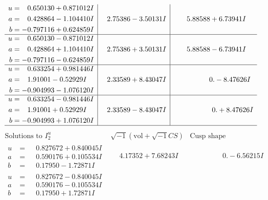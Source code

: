 \documentclass[1p]{elsarticle_modified}
\theoremstyle{definition}
\newcommand{\I}{\sqrt{-1}}
\begin{document}
$$\begin{array}{c|c|c}
\begin{aligned}
u &= \phantom{-}0.650130 + 0.871012 I \\
a &= \phantom{-}0.428864 - 1.104410 I \\
b &= -0.797116 + 0.624859 I\end{aligned}
 & \phantom{-}2.75386 - 3.50131 I & \phantom{-}5.88588 + 6.73941 I \\ \hline\begin{aligned}
u &= \phantom{-}0.650130 - 0.871012 I \\
a &= \phantom{-}0.428864 + 1.104410 I \\
b &= -0.797116 - 0.624859 I\end{aligned}
 & \phantom{-}2.75386 + 3.50131 I & \phantom{-}5.88588 - 6.73941 I \\ \hline\begin{aligned}
u &= \phantom{-}0.633254 + 0.981446 I \\
a &= \phantom{-}1.91001 - 0.52929 I \\
b &= -0.904993 - 1.076120 I\end{aligned}
 & \phantom{-}2.33589 + 8.43047 I & \phantom{-0.000000 } 0. - 8.47626 I \\ \hline\begin{aligned}
u &= \phantom{-}0.633254 - 0.981446 I \\
a &= \phantom{-}1.91001 + 0.52929 I \\
b &= -0.904993 + 1.076120 I\end{aligned}
 & \phantom{-}2.33589 - 8.43047 I & \phantom{-0.000000 -}0. + 8.47626 I\\
 \hline 
 \end{array}$$\newpage$$\begin{array}{c|c|c}  
\text{Solutions to }I^u_{2}& \I (\text{vol} + \sqrt{-1}CS) & \text{Cusp shape}\\
 \hline 
\begin{aligned}
u &= \phantom{-}0.827672 + 0.840045 I \\
a &= \phantom{-}0.590176 + 0.105534 I \\
b &= \phantom{-}0.17950 - 1.72871 I\end{aligned}
 & \phantom{-}4.17352 + 7.68243 I & \phantom{-0.000000 } 0. - 6.56215 I \\ \hline\begin{aligned}
u &= \phantom{-}0.827672 - 0.840045 I \\
a &= \phantom{-}0.590176 - 0.105534 I \\
b &= \phantom{-}0.17950 + 1.72871 I\end{aligned}

\end{array}$$
\end{document}
